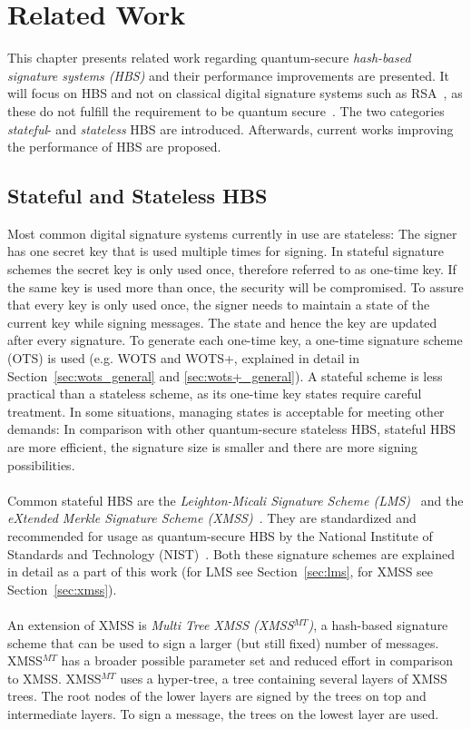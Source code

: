 \chapter{Related Work}
\label{cha:stateOfTheArt}
This chapter presents related work regarding quantum-secure \textit{hash-based signature systems (HBS)} and their performance improvements are presented. 
It will focus on HBS and not on classical digital signature systems such as RSA~\cite{rsa_patent}, as these do not fulfill the requirement to be quantum secure~\cite{RSA_pq-attack_examples_2018,comparison_performance_RSA_ECDSA_Merkle_WOTS_2021}.
The two categories \textit{stateful}- and \textit{stateless} HBS are introduced. Afterwards, current works improving the performance of HBS are proposed.

\section{Stateful and Stateless HBS}
Most common digital signature systems currently in use are stateless:
The signer has one secret key that is used multiple times for signing. In stateful signature schemes the secret key is only used once, therefore referred to as one-time key. 
If the same key is used more than once, the security will be compromised. 
To assure that every key is only used once, the signer needs to maintain a state of the current key while signing messages. The state and hence the key are updated after every signature. To generate each one-time key, a one-time signature scheme (OTS) is used (e.g. WOTS and WOTS+, explained in detail in Section~\ref{sec:wots_general} and \ref{sec:wots+_general}).
A stateful scheme is less practical than a stateless scheme, as its one-time key states require careful treatment.
In some situations, managing states is acceptable for meeting other demands: In comparison with other quantum-secure stateless HBS, stateful HBS are more efficient, the signature size is smaller and there are more signing possibilities.~\cite{properties_stateless_HBS_2022}
\\ \\
Common stateful HBS are the \textit{Leighton-Micali Signature Scheme (LMS)}~\cite{LMS_RFC8554} and the \textit{eXtended Merkle Signature Scheme (XMSS)}~\cite{xmss_RFC8391}. They are standardized and recommended for usage as quantum-secure HBS by the National Institute of Standards and Technology (NIST)~\cite{stateful_hashbased_sign_schemes_NIST_2020}. Both these signature schemes are explained in detail as a part of this work (for LMS see Section~\ref{sec:lms}, for XMSS see Section~\ref{sec:xmss}).
\\ \\
An extension of XMSS is \textit{Multi Tree XMSS (XMSS$^{MT}$)}, a hash-based
signature scheme that can be used to sign a larger (but still fixed) number of messages. XMSS$^{MT}$ has a broader possible parameter set and reduced effort in comparison to XMSS.
XMSS$^{MT}$ uses a hyper-tree, a tree containing several layers of XMSS trees. The root nodes of the lower layers are signed by the trees on top and intermediate layers. To sign a message, the trees on the lowest layer are used.~\cite{xmss_multitree_2013,xmss_RFC8391}

